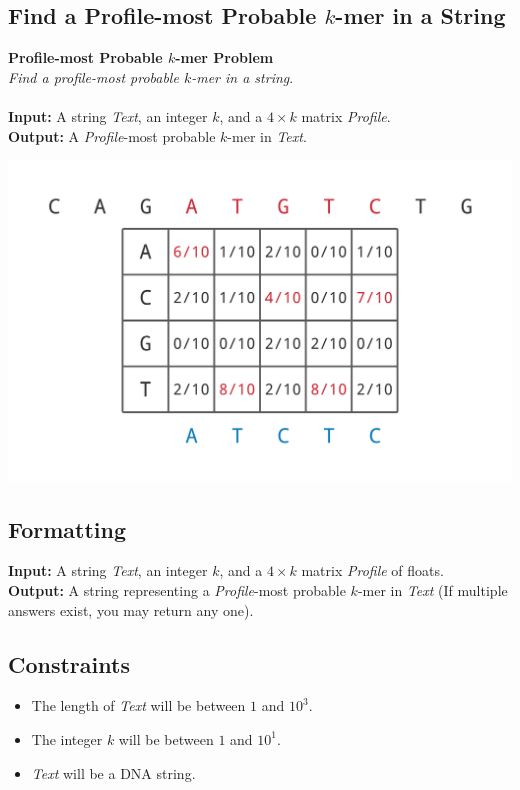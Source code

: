 \documentclass{article}
\begin{document}
\subsection{Find a Profile-most Probable $k$-mer in a String}
\hline\vspace{5}
\noindent\textbf{Profile-most Probable $k$-mer Problem}\\
\emph{Find a profile-most probable $k$-mer in a string}.\\ \\
\textbf{Input:} A string \emph{Text}, an integer $k$, and a $4\times k$ matrix \emph{Profile}.\\
\textbf{Output:} A \emph{Profile}-most probable $k$-mer in \emph{Text}.
\begin{center}
    \includegraphics[scale=0.2]{c2/logos/2C.png} 
\end{center}
\hline\vspace{5}

\subsection*{Formatting}
\textbf{Input:} A string \emph{Text}, an integer $k$, and a $4\times k$ matrix \emph{Profile} of floats.\\
\noindent\textbf{Output:} A string representing a \emph{Profile}-most probable $k$-mer in \emph{Text} (If multiple answers exist, you may return any one).

\subsection*{Constraints}
\begin{itemize}
    \item The length of \emph{Text} will be between $1$ and $10^3$.
    \item The integer $k$ will be between $1$ and $10^1$.
    \item \emph{Text} will be a DNA string.
\end{itemize}
\pagebreak
\end{document}
